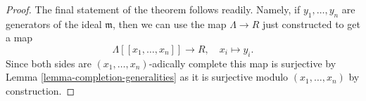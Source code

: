 \begin{proof}
\medskip\noindent
The final statement of the theorem follows readily. Namely, if
$y_1, \ldots, y_n$ are generators of the ideal $\mathfrak m$,
then we can use the map $\Lambda \to R$ just constructed
to get a map
$$
\Lambda[[x_1, \ldots, x_n]] \longrightarrow R,
\quad x_i \longmapsto y_i.
$$
Since both sides are $(x_1, \ldots, x_n)$-adically complete
this map is surjective by Lemma \ref{lemma-completion-generalities}
as it is surjective modulo $(x_1, \ldots, x_n)$ by
construction.
\end{proof}